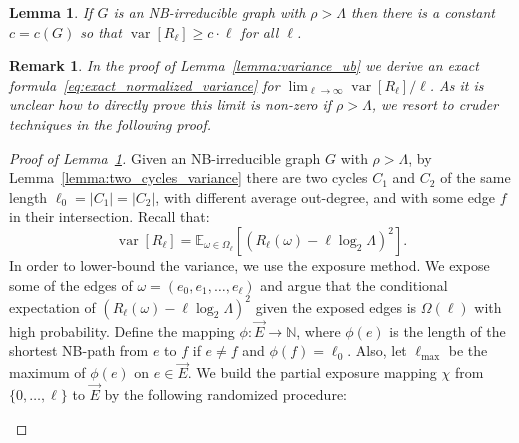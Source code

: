 \documentclass{article}
\newtheorem{lemma}[theorem]{Lemma}
\newtheorem{remark}[theorem]{Remark}
\newcommand{\dirE}{\vec{E}}
\newcommand{\N}{\mathbb{N}} %
\newcommand{\E}{\mathbb{E}} %
\DeclareMathOperator{\var}{var}
\begin{document}
\begin{lemma}\label{lemma:variance_lb}
    If $G$ is an NB-irreducible graph with $\rho > \Lambda$ then there is a constant $c=c(G)$ so that $\var[R_\ell] \geq c \cdot \ell$ for all $\ell$.
\end{lemma}

\begin{remark}
    In the proof of Lemma~\ref{lemma:variance_ub} we derive an exact formula~\eqref{eq:exact_normalized_variance} for $\lim_{\ell\to\infty}\var[R_\ell]/\ell$.
    As it is unclear how to directly prove this limit is non-zero if $\rho>\Lambda$, we resort to cruder techniques in the following proof.
\end{remark}

\begin{proof}[Proof of Lemma~\ref{lemma:variance_lb}]
    Given an NB-irreducible graph $G$ with $\rho > \Lambda$,
    by Lemma~\ref{lemma:two_cycles_variance} 
    there are two cycles $C_1$ and $C_2$ of the same length $\ell_0=|C_1| = |C_2|$, 
    with different average out-degree, and with some edge $f$ in their intersection.
    Recall that:
    \begin{equation*}
        \var[R_\ell] = \E_{\omega \in \Omega_\ell}\left[ {(R_\ell(\omega) - \ell \log_2\Lambda)}^2\right].
    \end{equation*}
    In order to lower-bound the variance, we use the exposure method. 
    We expose some of the edges of $\omega = (e_0,e_1,\ldots,e_\ell)$
    and argue that the conditional expectation of ${(R_\ell(\omega) - \ell \log_2\Lambda)}^2$ given the exposed edges is $\Omega(\ell)$ with high probability.
    Define the mapping $\phi:\dirE\to\N$, where $\phi(e)$ is the length of the shortest NB-path from $e$ to $f$ if $e \neq f$ and $\phi(f) = \ell_0$.
    Also, let $\ell_{\max}$ be the maximum of $\phi(e)$ on $e \in \dirE$.
    We build the partial exposure mapping $\chi$ from $\{0,\ldots,\ell\}$ to $\dirE$ by the following randomized procedure:
    
    \begin{center}
    \end{center}
    

\end{proof}
\end{document}
